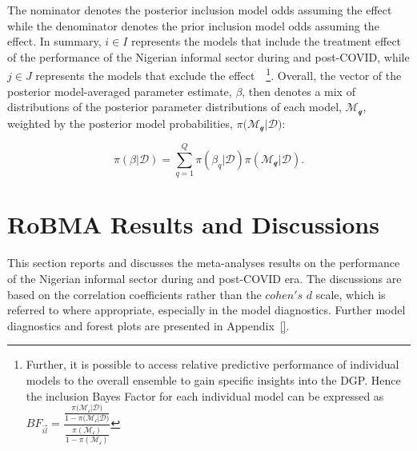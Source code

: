 \documentclass[12pt, english]{article}
\begin{document}
    The nominator denotes the posterior inclusion model odds assuming the effect while the denominator denotes the prior inclusion model odds assuming the effect. In summary, $i \in I$ represents the models that include the treatment effect of the performance of the Nigerian informal sector during and post-COVID, while $j \in J$ represents the models that exclude the effect~\parencites{gronau2021, hinne2020}~\footnote{Further, it is possible to access relative predictive performance of individual models to the overall ensemble to gain specific insights into the DGP. Hence the inclusion Bayes Factor for each individual model can be expressed as $BF_{\vec{\textit{il}}} = \dfrac{\frac{\pi(\mathcal{M_{\text{i}}|\mathcal{D})}}{1 - \pi(\mathcal{M_{\text{i}}|\mathcal{D})}}}{\frac{\pi(\mathcal{M_{\text{i}}})}{1 - \pi(\mathcal{M_{\text{i}}})}}$}. Overall, the vector of the posterior model-averaged parameter estimate, $\beta$, then denotes a mix of distributions of the posterior parameter distributions of each model, $\mathcal{M_{\text{q}}}$, weighted by the posterior model probabilities, $\pi(\mathcal{M_{\text{q}}|\mathcal{D})}:$

    \begin{equation}
        \label{equ18}
        \pi(\beta | \mathcal{D}) = \sum_{q = 1}^{Q} \pi(\beta_q | \mathcal{D}) \pi(\mathcal{M_\text{q}} | \mathcal{D}).
    \end{equation}


    \section{RoBMA Results and Discussions}\label{sec4:robma-results-and-discussion}
    This section reports and discusses the meta-analyses results on the performance of the Nigerian informal sector during and post-COVID era. The discussions are based on the correlation coefficients rather than the $cohen's$ $d$ scale, which is referred to where appropriate, especially in the model diagnostics. Further model diagnostics and forest plots are presented in Appendix~\ref{}.
\end{document}
